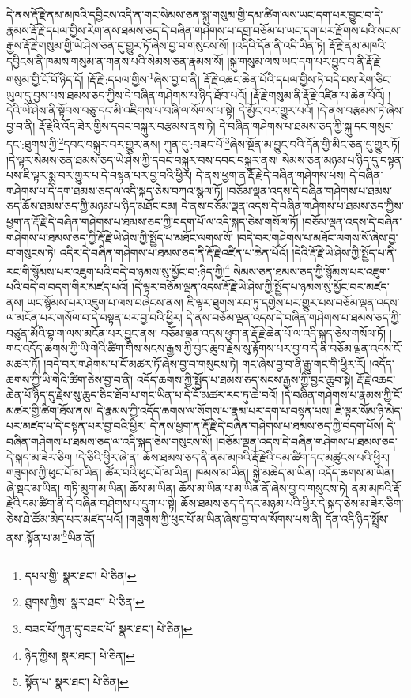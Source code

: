 དེ་ནས་རྡོ་རྗེ་ནམ་མཁའི་དབྱིངས་འདི་ན་གང་སེམས་ཅན་སྐུ་གསུམ་གྱི་དམ་ཚིག་ལས་ཡང་དག་པར་བྱུང་བ་དེ་རྣམས་རྡོ་རྗེ་དཔལ་གྱིས་རེག་ནས་ཐམས་ཅད་དེ་བཞིན་གཤེགས་པ་དགྲ་བཅོམ་པ་ཡང་དག་པར་རྫོགས་པའི་སངས་རྒྱས་རྡོ་རྗེ་གསུམ་གྱི་ཡེ་ཤེས་ཅན་དུ་གྱུར་ཏོ་ཞེས་བྱ་བ་གསུངས་སོ། །འདིའི་དོན་ནི་འདི་ཡིན་ཏེ། རྡོ་རྗེ་ནམ་མཁའི་དབྱིངས་ནི་ཁམས་གསུམ་ན་གནས་པའི་སེམས་ཅན་རྣམས་སོ། །སྐུ་གསུམ་ལས་ཡང་དག་པར་བྱུང་བ་ནི་རྡོ་རྗེ་གསུམ་གྱི་ངོ་བོ་ཉིད་དོ། །རྡོ་རྗེ་:དཔལ་གྱིས་\footnote{དཔལ་གྱི་  སྣར་ཐང་།  པེ་ཅིན། }ཞེས་བྱ་བ་ནི། རྡོ་རྗེ་འཆང་ཆེན་པོའི་དཔལ་གྱིས་ཏེ་བདེ་བས་རེག་ཅིང་ཡུལ་དུ་བྱས་པས་ཐམས་ཅད་ཀྱིས་དེ་བཞིན་གཤེགས་པ་ཉིད་ཐོབ་པའོ། །རྡོ་རྗེ་གསུམ་ནི་རྡོ་རྗེ་འཛིན་པ་ཆེན་པོའོ། །དེའི་ཡེ་ཤེས་ནི་སྟོབས་བཅུ་དང་མི་འཇིགས་པ་བཞི་ལ་སོགས་པ་སྟེ། དེ་མྱོང་བར་གྱུར་པའོ། །དེ་ནས་བརྩམས་ཏེ་ཞེས་བྱ་བ་ནི། རྡོ་རྗེའི་འོད་ཟེར་གྱིས་དབང་བསྐུར་བརྩམས་ནས་ཏེ། དེ་བཞིན་གཤེགས་པ་ཐམས་ཅད་ཀྱི་སྐུ་དང་གསུང་དང་:ཐུགས་ཀྱི་\footnote{ཐུགས་ཀྱིས་  སྣར་ཐང་།  པེ་ཅིན། }དབང་བསྐུར་བར་གྱུར་ནས། ཀུན་དུ་:བཟང་པོ་\footnote{བཟང་པོ་ཀུན་དུ་བཟང་པོ་  སྣར་ཐང་།  པེ་ཅིན། }ཞེས་སྔོན་མ་བྱུང་བའི་དོན་གྱི་མིང་ཅན་དུ་གྱུར་ཏོ། །དེ་ལྟར་སེམས་ཅན་ཐམས་ཅད་ཡེ་ཤེས་ཀྱི་དབང་བསྐུར་བས་དབང་བསྐུར་ནས། སེམས་ཅན་མཉམ་པ་ཉིད་དུ་བསྟན་པས་ཇི་ལྟར་སྨྲ་བར་གྱུར་པ་དེ་བསྟན་པར་བྱ་བའི་ཕྱིར། དེ་ནས་ཕྱག་ན་རྡོ་རྗེ་དེ་བཞིན་གཤེགས་པས། དེ་བཞིན་གཤེགས་པ་དེ་དག་ཐམས་ཅད་ལ་འདི་སྐད་ཅེས་བཀའ་སྩལ་ཏོ། །བཅོམ་ལྡན་འདས་དེ་བཞིན་གཤེགས་པ་ཐམས་ཅད་ཆོས་ཐམས་ཅད་ཀྱི་མཉམ་པ་ཉིད་མཐོང་ངམ། དེ་ནས་བཅོམ་ལྡན་འདས་དེ་བཞིན་གཤེགས་པ་ཐམས་ཅད་ཀྱིས་ཕྱག་ན་རྡོ་རྗེ་དེ་བཞིན་གཤེགས་པ་ཐམས་ཅད་ཀྱི་བདག་པོ་ལ་འདི་སྐད་ཅེས་གསོལ་ཏོ། །བཅོམ་ལྡན་འདས་དེ་བཞིན་གཤེགས་པ་ཐམས་ཅད་ཀྱི་རྡོ་རྗེ་ཡེ་ཤེས་ཀྱི་སྤྱོད་པ་མཐོང་ལགས་སོ། །བདེ་བར་གཤེགས་པ་མཐོང་ལགས་སོ་ཞེས་བྱ་བ་གསུངས་ཏེ། འདིར་དེ་བཞིན་གཤེགས་པ་ཐམས་ཅད་ནི་རྡོ་རྗེ་འཛིན་པ་ཆེན་པོའོ། །དེའི་རྡོ་རྗེ་ཡེ་ཤེས་ཀྱི་སྤྱོད་པ་ནི་རང་གི་སྙོམས་པར་འཇུག་པའི་བདེ་བ་ཉམས་སུ་མྱོང་བ་:ཉིད་ཀྱི།\footnote{ཉིད་ཀྱིས།  སྣར་ཐང་།  པེ་ཅིན། } སེམས་ཅན་ཐམས་ཅད་ཀྱི་སྙོམས་པར་འཇུག་པའི་བདེ་བ་བདག་གིར་མཛད་པའོ། །དེ་ལྟར་བཅོམ་ལྡན་འདས་རྡོ་རྗེ་ཡེ་ཤེས་ཀྱི་སྤྱོད་པ་ཉམས་སུ་མྱོང་བར་མཛད་ནས། ཡང་སྙོམས་པར་འཇུག་པ་ལས་བཞེངས་ནས། ཇི་ལྟར་ཐུགས་རབ་ཏུ་དགྱེས་པར་གྱུར་པས་བཅོམ་ལྡན་འདས་ལ་མངོན་པར་གསོལ་བ་དེ་བསྟན་པར་བྱ་བའི་ཕྱིར། དེ་ནས་བཅོམ་ལྡན་འདས་དེ་བཞིན་གཤེགས་པ་ཐམས་ཅད་ཀྱི་བཙུན་མོའི་བྷ་ག་ལས་མངོན་པར་བྱུང་ནས། བཅོམ་ལྡན་འདས་ཕྱག་ན་རྡོ་རྗེ་ཆེན་པོ་ལ་འདི་སྐད་ཅེས་གསོལ་ཏོ། །གང་འདོད་ཆགས་ཀྱི་ཡི་གེའི་ཚིག་གིས་སངས་རྒྱས་ཀྱི་བྱང་ཆུབ་རྗེས་སུ་རྟོགས་པར་བྱ་བ་དེ་ནི་བཅོམ་ལྡན་འདས་ངོ་མཚར་ཏོ། །བདེ་བར་གཤེགས་པ་ངོ་མཚར་ཏོ་ཞེས་བྱ་བ་གསུངས་ཏེ། གང་ཞེས་བྱ་བ་ནི་རྒྱུ་གང་གི་ཕྱིར་རོ། །འདོད་ཆགས་ཀྱི་ཡི་གེའི་ཚིག་ཅེས་བྱ་བ་ནི། འདོད་ཆགས་ཀྱི་སྤྱོད་པ་ཐམས་ཅད་སངས་རྒྱས་ཀྱི་བྱང་ཆུབ་སྟེ། རྡོ་རྗེ་འཆང་ཆེན་པོ་ཉིད་དུ་རྗེས་སུ་ཆུད་ཅིང་ཐོབ་པ་གང་ཡིན་པ་དེ་ངོ་མཚར་རབ་ཏུ་ཆེ་བའོ། །དེ་བཞིན་གཤེགས་པ་རྣམས་ཀྱི་ངོ་མཚར་གྱི་ཚིག་ཐོས་ནས། དེ་རྣམས་ཀྱི་འདོད་ཆགས་ལ་སོགས་པ་རྣམ་པར་དག་པ་བསྟན་པས། ཇི་ལྟར་སོམ་ཉི་མེད་པར་མཛད་པ་དེ་བསྟན་པར་བྱ་བའི་ཕྱིར། དེ་ནས་ཕྱག་ན་རྡོ་རྗེ་དེ་བཞིན་གཤེགས་པ་ཐམས་ཅད་ཀྱི་བདག་པོས། དེ་བཞིན་གཤེགས་པ་ཐམས་ཅད་ལ་འདི་སྐད་ཅེས་གསུངས་སོ། །བཅོམ་ལྡན་འདས་དེ་བཞིན་གཤེགས་པ་ཐམས་ཅད་དེ་སྐད་མ་ཟེར་ཅིག །དེ་ཅིའི་ཕྱིར་ཞེ་ན། ཆོས་ཐམས་ཅད་ནི་ནམ་མཁའི་རྡོ་རྗེའི་དམ་ཚིག་དང་མཚུངས་པའི་ཕྱིར། གཟུགས་ཀྱི་ཕུང་པོ་མ་ཡིན། ཚོར་བའི་ཕུང་པོ་མ་ཡིན། ཁམས་མ་ཡིན། སྐྱེ་མཆེད་མ་ཡིན། འདོད་ཆགས་མ་ཡིན། ཞེ་སྡང་མ་ཡིན། གཏི་མུག་མ་ཡིན། ཆོས་མ་ཡིན། ཆོས་མ་ཡིན་པ་མ་ཡིན་ནོ་ཞེས་བྱ་བ་གསུངས་ཏེ། ནམ་མཁའི་རྡོ་རྗེའི་དམ་ཚིག་ནི་དེ་བཞིན་གཤེགས་པ་དྲུག་པ་སྟེ། ཆོས་ཐམས་ཅད་དེ་དང་མཉམ་པའི་ཕྱིར་དེ་སྐད་ཅེས་མ་ཟེར་ཅིག་ཅེས་ཐེ་ཚོམ་མེད་པར་མཛད་པའོ། །གཟུགས་ཀྱི་ཕུང་པོ་མ་ཡིན་ཞེས་བྱ་བ་ལ་སོགས་པས་ནི། དོན་འདི་ཉིད་སྤྲོས་ནས་:སྟོན་པ་མ་\footnote{སྟོན་པ་  སྣར་ཐང་།  པེ་ཅིན། }ཡིན་ནོ། 